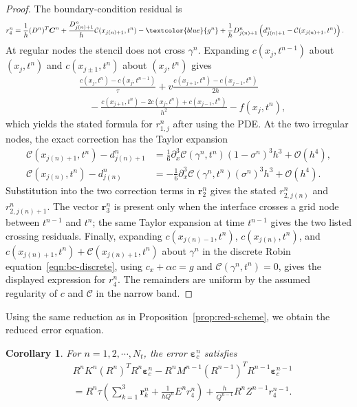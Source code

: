 \documentclass[11pt,reqno]{amsart}
\theoremstyle{plain}
\newtheorem{corollary}[theorem]{Corollary}
\theoremstyle{definition}
\numberwithin{equation}{section}
\newcommand{\paren}[1]{\left(#1\right)}
\newcommand{\p}{\partial}
\newcommand{\mc}[1]{\mathcal{#1}}
\newcommand{\bm}[1]{\boldsymbol{#1}}
\newcommand{\Corr}{\mathcal C}
\begin{document}
\begin{proof}
The boundary-condition residual is
\begin{align}
    r_4^n &
    = \frac{1}{h} (D^n)^T \bm C^n + \frac{D^n_{j(n)+1}}{h} \Corr(x_{j(n)+1},t^n) - \textcolor{blue}{g^n} + \frac{1}{h}D^n_{j(n)+1}\paren{ d_{j(n)+1}^n - \Corr(x_{j(n)+1},t^n) }.
\end{align}
At regular nodes the stencil does not cross $\gamma^n$. Expanding
$c(x_j,t^{n-1})$ about $(x_j,t^n)$ and $c(x_{j\pm1},t^n)$ about
$(x_j,t^n)$ gives
\begin{equation}
\begin{aligned}
    &\frac{c(x_j,t^n)-c(x_j,t^{n-1})}{\tau}
    +v\frac{c(x_{j+1},t^n)-c(x_{j-1},t^n)}{2h}\\
    &\quad-\frac{c(x_{j+1},t^n)-2c(x_j,t^n)+c(x_{j-1},t^n)}{h^2}
    -f(x_j,t^n),
\end{aligned}
\end{equation}
which yields the stated formula for $r_{1,j}^n$ after using the PDE.
At the two irregular nodes, the exact correction has the Taylor expansion
\begin{equation}
\begin{aligned}
    \Corr(x_{j(n)+1},t^n)-d_{j(n)+1}^n
    &=\frac16 \p_x^3\Corr(\gamma^n,t^n)(1-\sigma^n)^3h^3+\mc O(h^4),\\
    \Corr(x_{j(n)},t^n)-d_{j(n)}^n
    &=-\frac16 \p_x^3\Corr(\gamma^n,t^n)(\sigma^n)^3h^3+\mc O(h^4).
\end{aligned}
\end{equation}
Substitution into the two correction terms in $\bm r_2^n$ gives the stated
$r_{2,j(n)}^n$ and $r_{2,j(n)+1}^n$. The vector $\bm r_3^n$ is present only
when the interface crosses a grid node between $t^{n-1}$ and $t^n$; the same
Taylor expansion at time $t^{n-1}$ gives the two listed crossing residuals.
Finally, expanding $c(x_{j(n)-1},t^n)$, $c(x_{j(n)},t^n)$, and
$c(x_{j(n)+1},t^n)+\Corr(x_{j(n)+1},t^n)$ about $\gamma^n$ in the discrete
Robin equation~\eqref{eqn:bc-discrete}, using
$c_x+\alpha c=g$ and $\Corr(\gamma^n,t^n)=0$, gives the displayed expression
for $r_4^n$. The remainders are uniform by the assumed regularity of $c$ and
$\Corr$ in the narrow band.
\end{proof}


Using the same reduction as in Proposition~\ref{prop:red-scheme}, we obtain the reduced error equation.
\begin{corollary}\label{cor:red-LTE}
For $n=1,2,\cdots, N_t$, the error $\bm\varepsilon_c^n$ satisfies
\begin{equation}\label{eqn:err-eqn}
\begin{aligned}
    & R^n K^n (R^n)^T R^n \bm\varepsilon_c^n - R^n M^{n-1}  (R^{n-1})^T R^{n-1} \bm \varepsilon_c^{n-1} \\
    &= R^n \tau\paren{ \sum_{k=1}^3 \bm r_k^n+ \frac{1}{hQ^n} E^n  r_4^n} + \frac{h}{Q^{n-1}} R^n  Z^{n-1} r_4^{n-1}.
\end{aligned}
\end{equation}
\end{corollary}
\end{document}
